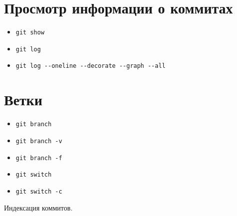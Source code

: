 \documentclass{article}
\begin{document}
\section{Просмотр информации о коммитах}
\begin{itemize}
\item \texttt{git show}
\item \texttt{git log}
\item \texttt{git log -{}-oneline -{}-decorate -{}-graph -{}-all}
\end{itemize}


\section{Ветки}
\begin{itemize}
\item \texttt{git branch}
\item \texttt{git branch -v}
\item \texttt{git branch -f}
\item \texttt{git switch}
\item \texttt{git switch -c}
\end{itemize}
Индексация коммитов.
\end{document}
